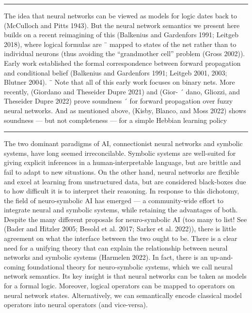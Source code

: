 \documentclass[letterpaper]{article}
\begin{document}
\hrule

The idea that neural networks
can be viewed as models for logic dates back to (McCulloch
and Pitts 1943). But the neural network semantics we present
here builds on a recent reimagining of this (Balkenius and
Gardenfors 1991; Leitgeb 2018), where logical formulas are ¨
mapped to states of the net rather than to individual neurons (thus avoiding the “grandmother cell” problem (Gross
2002)). Early work established the formal correspondence between forward propagation and conditional belief (Balkenius
and Gardenfors 1991; Leitgeb 2001, 2003; Blutner 2004). ¨
Note that all of this early work focuses on binary nets. More
recently, (Giordano and Theseider Dupre 2021) and (Gior- ´
dano, Gliozzi, and Theseider Dupre 2022) prove soundness ´
for forward propagation over fuzzy neural networks. And as
mentioned above, (Kisby, Blanco, and Moss 2022) shows
soundness — but not completeness — for a simple Hebbian
learning policy

\hrule

The two dominant paradigms of AI, connectionist neural
networks and symbolic systems, have long seemed irreconcilable. Symbolic systems are well-suited for giving explicit
inferences in a human-interpretable language, but are brittle and fail to adapt to new situations. On the other hand,
neural networks are flexible and excel at learning from unstructured data, but are considered black-boxes due to how
difficult it is to interpret their reasoning. In response to this
dichotomy, the field of neuro-symbolic AI has emerged —
a community-wide effort to integrate neural and symbolic
systems, while retaining the advantages of both. Despite the
many different proposals for neuro-symbolic AI (too many to
list! See (Bader and Hitzler 2005; Besold et al. 2017; Sarker
et al. 2022)), there is little agreement on what the interface
between the two ought to be. There is a clear need for a unifying theory that can explain the relationship between neural
networks and symbolic systems (Harmelen 2022).
In fact, there is an up-and-coming foundational theory for
neuro-symbolic systems, which we call neural network semantics. Its key insight is that neural networks can be taken
as models for a formal logic. Moreover, logical operators can
be mapped to operators on neural network states. Alternatively, we can semantically encode classical model operators
into neural operators (and vice-versa).
\end{document}
